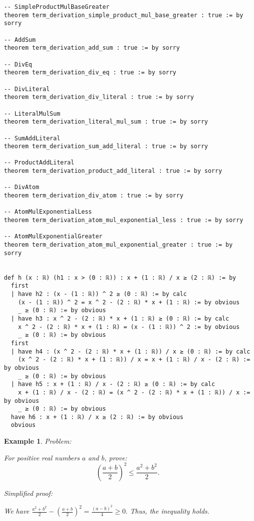 \documentclass{article}
\newtheorem{example}{Example}
\begin{document}
\begin{tcolorbox}[colback=white!10, width=\linewidth]
\begin{lstlisting}[language=Lean4]
-- SimpleProductMulBaseGreater
theorem term_derivation_simple_product_mul_base_greater : true := by sorry

-- AddSum
theorem term_derivation_add_sum : true := by sorry

-- DivEq
theorem term_derivation_div_eq : true := by sorry

-- DivLiteral
theorem term_derivation_div_literal : true := by sorry

-- LiteralMulSum
theorem term_derivation_literal_mul_sum : true := by sorry

-- SumAddLiteral
theorem term_derivation_sum_add_literal : true := by sorry

-- ProductAddLiteral
theorem term_derivation_product_add_literal : true := by sorry

-- DivAtom
theorem term_derivation_div_atom : true := by sorry

-- AtomMulExponentialLess
theorem term_derivation_atom_mul_exponential_less : true := by sorry

-- AtomMulExponentialGreater
theorem term_derivation_atom_mul_exponential_greater : true := by sorry


def h (x : ℝ) (h1 : x > (0 : ℝ)) : x + (1 : ℝ) / x ≥ (2 : ℝ) := by
  first
  | have h2 : (x - (1 : ℝ)) ^ 2 ≥ (0 : ℝ) := by calc
    (x - (1 : ℝ)) ^ 2 = x ^ 2 - (2 : ℝ) * x + (1 : ℝ) := by obvious
    _ ≥ (0 : ℝ) := by obvious
  | have h3 : x ^ 2 - (2 : ℝ) * x + (1 : ℝ) ≥ (0 : ℝ) := by calc
    x ^ 2 - (2 : ℝ) * x + (1 : ℝ) = (x - (1 : ℝ)) ^ 2 := by obvious
    _ ≥ (0 : ℝ) := by obvious
  first
  | have h4 : (x ^ 2 - (2 : ℝ) * x + (1 : ℝ)) / x ≥ (0 : ℝ) := by calc
    (x ^ 2 - (2 : ℝ) * x + (1 : ℝ)) / x = x + (1 : ℝ) / x - (2 : ℝ) := by obvious
    _ ≥ (0 : ℝ) := by obvious
  | have h5 : x + (1 : ℝ) / x - (2 : ℝ) ≥ (0 : ℝ) := by calc
    x + (1 : ℝ) / x - (2 : ℝ) = (x ^ 2 - (2 : ℝ) * x + (1 : ℝ)) / x := by obvious
    _ ≥ (0 : ℝ) := by obvious
  have h6 : x + (1 : ℝ) / x ≥ (2 : ℝ) := by obvious
  obvious

\end{lstlisting}
\end{tcolorbox}


\begin{example}
Problem:
\begin{tcolorbox}[colback=yellow!10, width=\linewidth]
For positive real numbers $a$ and $b$, prove:
    $$\left(\frac{a+b}{2}\right)^2 \leq \frac{a^2+b^2}{2}.$$
\end{tcolorbox}

Simplified proof:
\begin{tcolorbox}[colback=blue!10, width=\linewidth]
We have
$ \frac{a^2+b^2}{2} - \left(\frac{a+b}{2}\right)^2 = \frac{(a-b)^2}{4} \ge 0. $
Thus, the inequality holds.
\end{tcolorbox}
\end{example}
\end{document}
